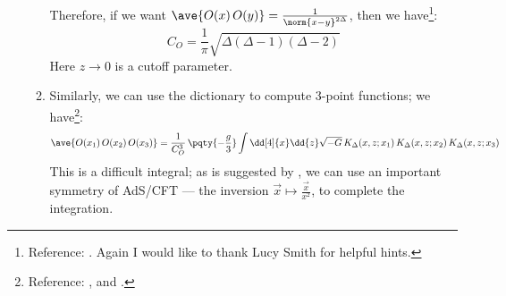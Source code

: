 \documentclass[a4paper,10pt]{article}
\begin{document}
\begin{enumerate}
\begin{enumerate}
	Therefore, if we want $
		\ave{O(x)\,O(y)}
		= \frac{1}{\norm{x - y}^{2\Delta}}
	$, then we have\footnote{
		Reference: . Again I would like to thank Lucy Smith for helpful hints. 
	}:
	\begin{equation}
		C_O
		= \frac{1}{\pi} \sqrt{
				\Delta(\Delta - 1)(\Delta - 2)
			}
	\end{equation}
	Here $z\to 0$ is a cutoff parameter. 
	
	\item Similarly, we can use the dictionary to compute 3-point functions; we have\footnote{
		Reference: , and . 
	}:
	\begin{equation}
		\ave{O(x_1)\,O(x_2)\,O(x_3)}
		= \frac{1}{C_O^3}\,
			\pqty{-\frac{g}{3}}
			\int \dd[4]{x} \dd{z} \sqrt{-G}\,
				K_\Delta(x,z;x_1)\,
				K_\Delta(x,z;x_2)\,
				K_\Delta(x,z;x_3)
	\end{equation}
	This is a difficult integral; as is suggested by , we can use an important symmetry of AdS/CFT --- the inversion $
		\vec{x}\mapsto \frac{\vec{x}}{x^2}
	$, to complete the integration. 
	

\end{enumerate}
\end{enumerate}
\end{document}
